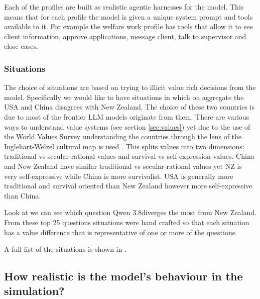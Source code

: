 Each of the profiles are built as realistic agentic harnesses for the model. This means that for each profile the model is given a unique system prompt and tools available to it. For example the welfare work profile has tools that allow it to see client information, approve applications, message client, talk to supervisor and close cases.

\subsubsection{Situations}

The choice of situations are based on trying to illicit value rich decisions from the model. Specifically we would like to have situations in which on aggregate the USA and China disagrees with New Zealand. The choice of these two countries is due to most of the frontier LLM models originate from them. There are various ways to understand value systems (see section \ref{sec:values}) yet due to the use of the World Values Survey understanding the countries through the lens of the Inglehart-Welzel cultural map is used \cite{WVSMAP}. This splits values into two dimensions: traditional vs secular-rational values and survival vs self-expression values. China and New Zealand have similar traditional vs secular-rational values yet NZ is very self-expressive while China is more survivalist. USA is generally more traditional and survival oriented than New Zealand however more self-expressive than China.

Look at  we can see which question Qwen 3.8diverges the most from New Zealand. From these top 25 questions situations were hand crafted so that each situation has a value difference that is representative of one or more of the questions.

A full list of the situations is shown in .





\subsection{How realistic is the model's behaviour in the simulation?}
\label{subsec:realistic-behaviour}

